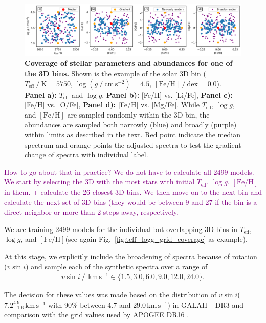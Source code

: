 \documentclass[
  journal=pasa,
  manuscript=research-paper, %
  year=2021,
  volume=37,
]{cup-journal}
\newcommand{\SB}[1]{{\textcolor{purple}{#1}}}
\newcommand{\Teff}{$T_\mathrm{eff}$\xspace}
\newcommand{\logg}{$\log g$\xspace}
\newcommand{\feh}{$\mathrm{[Fe/H]}$\xspace}
\newcommand{\vsini}{$v \sin i$\xspace}
\newcommand{\kms}{\,\mathrm{km\,s^{-1}}}	%
\begin{document}
\begin{figure}[hbt!]
 \centering
 \includegraphics[width=\textwidth]{figures/example_3d_bin_sample.png}
 \caption{\textbf{Coverage of stellar parameters and abundances for one of the 3D bins.} Shown is the example of the solar 3D bin ($T_\mathrm{eff}~/~\mathrm{K} = 5750$, $\log (g~/~\mathrm{cm\,s^{-2}}) = 4.5$, $\mathrm{[Fe/H]}~/~\mathrm{dex} = 0.0$). \textbf{Panel a):} \Teff and \logg, \textbf{Panel b):} [Fe/H] vs. [Li/Fe], \textbf{Panel c):} [Fe/H] vs. [O/Fe], \textbf{Panel d):} [Fe/H] vs. [Mg/Fe]. While \Teff, \logg, and \feh are sampled randomly within the 3D bin, the abundances are sampled both narrowly (blue) and broadly (purple) within limits as described in the text. Red point indicate the median spectrum and orange points the adjusted spectra to test the gradient change of spectra with individual label.}
 \label{fig:cannon_interpolation}
\end{figure}

\SB{How to go about that in practice? We do not have to calculate all 2499 models. We start by selecting the 3D with the most stars with initial \Teff, \logg, \feh in them. + calculate the 26 closest 3D bins. We then move on to the next bin and calculate the next set of 3D bins (they would be between 9 and 27 if the bin is a direct neighbor or more than 2 steps away, respectively.}

We are training 2499 models for the individual but overlapping 3D bins in \Teff, \logg, and \feh (see again Fig.~\ref{fig:teff_logg_grid_coverage} as example).

At this stage, we explicitly include the broadening of spectra because of rotation (\vsini) and sample each of the synthetic spectra over a range of
\begin{align} \label{eq:vsini}
    v \sin i~/~\kms \in \{ 1.5, 3.0, 6.0, 9.0, 12.0, 24.0\}.
\end{align}

The decision for these values was made based on the distribution of \vsini ($7.2_{-1.6}^{4.9}\kms$ with 90\% between 4.7 and $29.0\kms$) in GALAH+ DR3 and comparison with the grid values used by APOGEE DR16 \citep{Joensson2020}.
\end{document}
